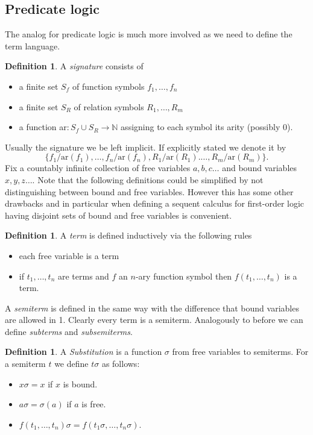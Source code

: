 \documentclass[a4paper,11pt]{report}
\theoremstyle{definition}
\theoremstyle{definition}
\theoremstyle{definition}
\theoremstyle{definition}
\theoremstyle{definition}
\newtheorem{definition}[theorem]{Definition}
\theoremstyle{definition}
\theoremstyle{definition}
\begin{document}
	\subsection{Predicate logic}
	
	The analog for predicate logic is much more involved as we need to define the term language.
	
	\begin{definition}
		A \textit{signature} consists of
		\begin{itemize}
			\item a finite set $S_f$ of function symbols $f_1, \dots, f_n$
			\item a finite set $S_R$ of relation symbols $R_1,\dots, R_m$
			\item  a function ar$: S_f\cup S_R\to \mathbb{N}$ assigning to each symbol its arity (possibly 0). 
		\end{itemize}
	\end{definition}
	
	\noindent Usually the signature we be left implicit. If explicitly stated we denote it by $$\{f_1/\text{ar}(f_1),\dots,f_n/\text{ar}(f_n), R_1/\text{ar}(R_1).\dots,R_m/\text{ar}(R_m)\}.$$
	Fix a countably infinite collection of free variables $a, b, c\dots$ and bound variables $x, y, z\dots$.
	Note that the following definitions could be simplified by not distinguishing between bound and free variables. However this has some other drawbacks and in particular when defining a sequent calculus for first-order logic having disjoint sets of bound and free variables is convenient.
	
	\begin{definition}
		A \textit{term} is defined inductively via the following rules
		\begin{itemize}
			\item each free variable is a term
			\item if $t_1,\dots,t_n$ are terms and $f$ an $n$-ary function symbol then $f(t_1, \dots, t_n)$ is a term.
		\end{itemize}
		A \textit{semiterm} is defined in the same way with the difference that bound variables are allowed in 1. Clearly every term is a semiterm. Analogously to before we can define \textit{subterms} and \textit{subsemiterms}.
	\end{definition}

	\begin{definition}
		A \textit{Substitution} is a function $\sigma$ from free variables to semiterms. For a semiterm $t$ we define $t\sigma$ as follows:
		\begin{itemize}
			\item $x\sigma = x$ if $x$ is bound.
			\item $a\sigma = \sigma(a)$ if $a$ is free.
			\item $f(t_1,\dots,t_n)\sigma = f(t_1\sigma,\dots,t_n\sigma)$.
		\end{itemize}
	\end{definition}
	
\end{document}
